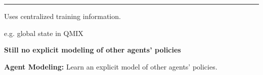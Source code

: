\begin{frame}
\vspace{0.25em}
\color{gray!30}\rule{\textwidth}{0.4pt}
\color{black}\vspace{0.25em}

\noindent
\begin{minipage}[c][1.10cm][c]{0.20\textwidth}
    \centering
\end{minipage}\hfill
\begin{minipage}[c][1.10cm][c]{0.39\textwidth}
    \centering
    \small Uses centralized training information.
\end{minipage}\hfill
\begin{minipage}[c][1.10cm][c]{0.34\textwidth}
    \raggedright
    {\footnotesize\color{black!55} \textrm{e.g.} global state in QMIX}
\end{minipage}

\vspace{0.50em}

{\color{red!70!black}\textbf{\small Still no explicit modeling of other agents' policies}}

\vspace{0.08em}

{\color{green!60!black}\bfseries Agent Modeling:} {\color{black} Learn an explicit model of other agents' policies.}

\end{frame}

